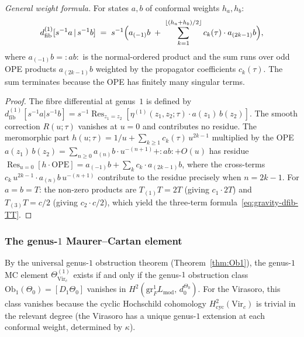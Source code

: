 \begin{computation}
\emph{General weight formula.}
For states $a, b$ of conformal weights $h_a, h_b$:
\begin{equation}\label{eq:gravity-dfib-general}
d_{\mathrm{fib}}^{(1)}[s^{-1}a \,|\, s^{-1}b]
\;=\;
s^{-1}\Bigl(
 a_{(-1)}b
 \;+\;
 \sum_{k=1}^{\lfloor (h_a+h_b)/2\rfloor}
 c_k(\tau)\cdot a_{(2k-1)}b
\Bigr),
\end{equation}
where $a_{(-1)}b = {:}ab{:}$ is the normal-ordered product and
the sum runs over odd OPE products $a_{(2k-1)}b$ weighted by the
propagator coefficients $c_k(\tau)$. The sum terminates because
the OPE has finitely many singular terms.
\end{computation}

\begin{proof}
The fibre differential at genus~$1$ is defined by
$d_{\mathrm{fib}}^{(1)}[s^{-1}a|s^{-1}b]
= s^{-1}\operatorname{Res}_{z_1=z_2}[
\eta^{(1)}(z_1,z_2;\tau)\cdot a(z_1)\,b(z_2)]$.
The smooth correction $R(u;\tau)$ vanishes at $u = 0$ and
contributes no residue. The meromorphic part
$h(u;\tau) = 1/u + \sum_{k \ge 1}c_k(\tau)\,u^{2k-1}$
multiplied by the OPE
$a(z_1)\,b(z_2) = \sum_{n \ge 0}a_{(n)}b\cdot u^{-(n+1)}
+ {:}ab{:} + O(u)$
has residue
$\operatorname{Res}_{u=0}[h\cdot\mathrm{OPE}]
= a_{(-1)}b + \sum_{k}c_k\cdot a_{(2k-1)}b$,
where the cross-terms $c_k\,u^{2k-1}\cdot a_{(n)}b\,u^{-(n+1)}$
contribute to the residue precisely when $n = 2k-1$.
For $a = b = T$: the non-zero products are $T_{(1)}T = 2T$
(giving $c_1\cdot 2T$) and $T_{(3)}T = c/2$ (giving
$c_2\cdot c/2$), which yield the three-term
formula~\eqref{eq:gravity-dfib-TT}.
\end{proof}

\subsubsection*{The genus-$1$ Maurer--Cartan element}

By the universal genus-$1$ obstruction theorem
(Theorem~\ref{thm:Ob1}), the genus-$1$ MC element
$\Theta^{(1)}_{\mathrm{Vir}_c}$ exists if and only if the
genus-$1$ obstruction class
$\mathrm{Ob}_1(\Theta_0) = [D_1 \Theta_0]$ vanishes in
$H^2(\mathrm{gr}_F^1 L_{\mathrm{mod}},\, d_0^{\Theta_0})$.
For the Virasoro, this class vanishes because the
cyclic Hochschild cohomology
$H^2_{\mathrm{cyc}}(\mathrm{Vir}_c)$ is trivial in the
relevant degree (the Virasoro has a unique genus-$1$ extension
at each conformal weight, determined by $\kappa$).

